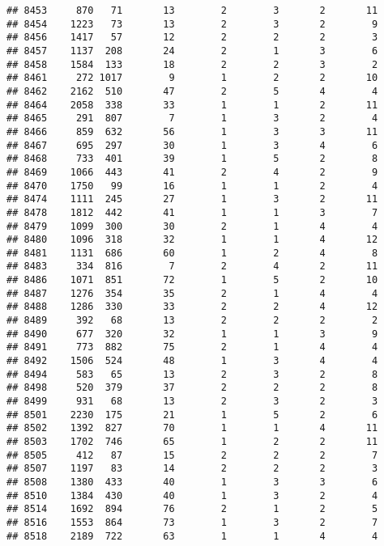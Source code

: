 \documentclass[]{article}
\begin{document}
\begin{verbatim}
## 8453     870   71       13        2        3       2       11
## 8454    1223   73       13        2        3       2        9
## 8456    1417   57       12        2        2       2        3
## 8457    1137  208       24        2        1       3        6
## 8458    1584  133       18        2        2       3        2
## 8461     272 1017        9        1        2       2       10
## 8462    2162  510       47        2        5       4        4
## 8464    2058  338       33        1        1       2       11
## 8465     291  807        7        1        3       2        4
## 8466     859  632       56        1        3       3       11
## 8467     695  297       30        1        3       4        6
## 8468     733  401       39        1        5       2        8
## 8469    1066  443       41        2        4       2        9
## 8470    1750   99       16        1        1       2        4
## 8474    1111  245       27        1        3       2       11
## 8478    1812  442       41        1        1       3        7
## 8479    1099  300       30        2        1       4        4
## 8480    1096  318       32        1        1       4       12
## 8481    1131  686       60        1        2       4        8
## 8483     334  816        7        2        4       2       11
## 8486    1071  851       72        1        5       2       10
## 8487    1276  354       35        2        1       4        4
## 8488    1286  330       33        2        2       4       12
## 8489     392   68       13        2        2       2        2
## 8490     677  320       32        1        1       3        9
## 8491     773  882       75        2        1       4        4
## 8492    1506  524       48        1        3       4        4
## 8494     583   65       13        2        3       2        8
## 8498     520  379       37        2        2       2        8
## 8499     931   68       13        2        3       2        3
## 8501    2230  175       21        1        5       2        6
## 8502    1392  827       70        1        1       4       11
## 8503    1702  746       65        1        2       2       11
## 8505     412   87       15        2        2       2        7
## 8507    1197   83       14        2        2       2        3
## 8508    1380  433       40        1        3       3        6
## 8510    1384  430       40        1        3       2        4
## 8514    1692  894       76        2        1       2        5
## 8516    1553  864       73        1        3       2        7
## 8518    2189  722       63        1        1       4        4

\end{verbatim}
\end{document}
